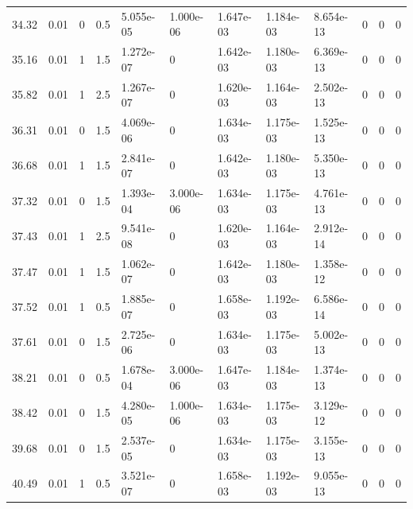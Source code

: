 \documentclass[preview]{standalone}
\begin{document}
{{{\begin{tabular}{L{1.2cm}C{1.2cm} C{0.3cm}C{0.5cm} C{1.4cm}C{1.4cm} C{1.4cm}C{1.4cm} C{1.6cm}C{1.6cm} C{1.6cm}C{1.6cm}}
  34.32  &  0.01  & 0     & 0.5 &  5.055e-05  & 1.000e-06  &  1.647e-03&   1.184e-03& 8.654e-13 & 0   &  0 & 0  \\ 
  35.16  &  0.01  & 1     & 1.5 &  1.272e-07  & 0  &  1.642e-03&   1.180e-03& 6.369e-13 & 0   &  0 & 0  \\ 
  35.82  &  0.01  & 1     & 2.5 &  1.267e-07  & 0  &  1.620e-03&   1.164e-03& 2.502e-13 & 0   &  0 & 0  \\ 
  36.31  &  0.01  & 0     & 1.5 &  4.069e-06  & 0  &  1.634e-03&   1.175e-03& 1.525e-13 & 0   &  0 & 0  \\ 
  36.68  &  0.01  & 1     & 1.5 &  2.841e-07  & 0  &  1.642e-03&   1.180e-03& 5.350e-13 & 0   &  0 & 0  \\ 
  37.32  &  0.01  & 0     & 1.5 &  1.393e-04  & 3.000e-06  &  1.634e-03&   1.175e-03& 4.761e-13 & 0   &  0 & 0  \\ 
  37.43  &  0.01  & 1     & 2.5 &  9.541e-08  & 0  &  1.620e-03&   1.164e-03& 2.912e-14 & 0   &  0 & 0  \\ 
  37.47  &  0.01  & 1     & 1.5 &  1.062e-07  & 0  &  1.642e-03&   1.180e-03& 1.358e-12 & 0   &  0 & 0  \\ 
  37.52  &  0.01  & 1     & 0.5 &  1.885e-07  & 0  &  1.658e-03&   1.192e-03& 6.586e-14 & 0   &  0 & 0  \\ 
  37.61  &  0.01  & 0     & 1.5 &  2.725e-06  & 0  &  1.634e-03&   1.175e-03& 5.002e-13 & 0   &  0 & 0  \\ 
  38.21  &  0.01  & 0     & 0.5 &  1.678e-04  & 3.000e-06  &  1.647e-03&   1.184e-03& 1.374e-13 & 0   &  0 & 0  \\ 
  38.42  &  0.01  & 0     & 1.5 &  4.280e-05  & 1.000e-06  &  1.634e-03&   1.175e-03& 3.129e-12 & 0   &  0 & 0  \\ 
  39.68  &  0.01  & 0     & 1.5 &  2.537e-05  & 0  &  1.634e-03&   1.175e-03& 3.155e-13 & 0   &  0 & 0  \\ 
  40.49  &  0.01  & 1     & 0.5 &  3.521e-07  & 0  &  1.658e-03&   1.192e-03& 9.055e-13 & 0   &  0 & 0  \\ 
\hline 
\end{tabular} 

}}}
\end{document}
